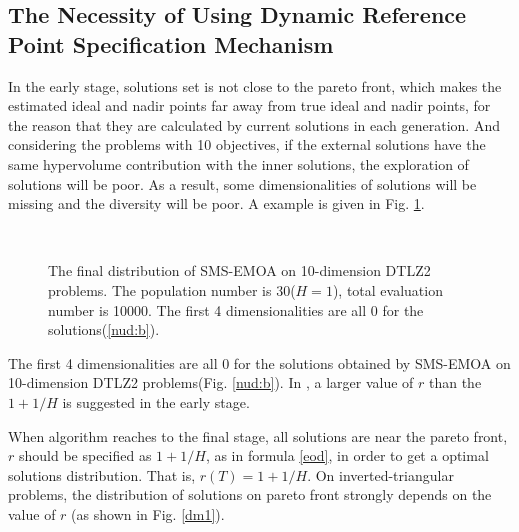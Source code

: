 \documentclass[conference]{IEEEtran}
\begin{document}
\subsection{The Necessity of Using Dynamic Reference Point Specification Mechanism}
In the early stage, solutions set is not close to the pareto front, which makes the 
estimated ideal and nadir points far away from true ideal and nadir points, for the reason that
they are calculated by current solutions in each generation. 
And considering the problems with 10 objectives, 
if the external solutions have the same hypervolume contribution with the inner solutions,
the exploration of solutions will be poor. 
As a result, some dimensionalities of solutions will be missing and the diversity will be poor. 
A example is given in Fig. \ref{nud}. 
\begin{figure}[!t]
  \centering
  \quad
  \\
  \caption{
    The final distribution of SMS-EMOA on 10-dimension DTLZ2 problems. 
    The population number is 30($H=1$), total evaluation number is 10000.
    The first 4 dimensionalities are all 0 for the solutions(\ref{nud:b}). 
  }
  \label{nud}
\end{figure} 
The first 4 dimensionalities are all 0 for the solutions obtained by SMS-EMOA on 10-dimension DTLZ2 problems(Fig. \ref{nud:b}). 
In \cite{hisao:dynamic}, a larger value of $r$ than the $1+1/H$ is suggested in the early stage. 

When algorithm reaches to the final stage, all solutions are near the pareto front, $r$ should
be specified as $1+1/H$, as in formula \ref{eod}, 
in order to get a optimal solutions distribution. 
That is, $r(T)=1+1/H$. 
On inverted-triangular problems, the distribution of solutions on pareto front
strongly depends on the value of $r$ (as shown in Fig. \ref{dm1}). 
\end{document}
